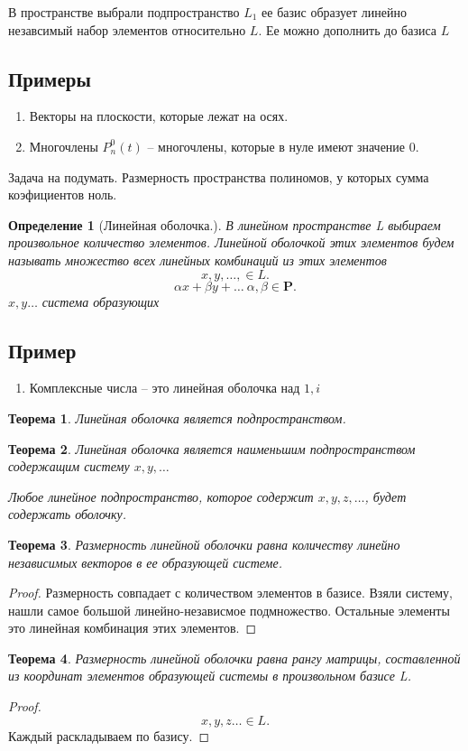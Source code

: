 \documentclass{scrartcl}
\newtheorem{theorem}{Теорема}
\newtheorem{definition}{Определение}
\begin{document}
В пространстве выбрали подпространство $L_1$ ее базис образует линейно незавсимый набор элементов относительно $L$. Ее можно дополнить до базиса $L$
\subsection{Примеры}
\begin{enumerate}
	\item Векторы на плоскости, которые лежат на осях.
	\item Многочлены $P^{0}_{n}(t)$ -- многочлены, которые в нуле имеют значение 0.
\end{enumerate}
Задача на подумать. Размерность пространства полиномов, у которых сумма коэфициентов ноль.
\begin{definition}[Линейная оболочка.]
	В линейном пространстве L выбираем произвольное количество элементов. Линейной оболочкой этих элементов будем называть множество всех линейных комбинаций из этих элементов
	\[
		x,y,\dots, \in L
		.\]
	\[
		\alpha x + \beta y + \dots ~ \alpha,\beta \in \mathbf{P}
		.\]
	$x,y \dots$ система образующих
\end{definition}
\subsection{Пример}
\begin{enumerate}
	\item Комплексные числа -- это линейная оболочка над $1,i$
\end{enumerate}
\begin{theorem}
	Линейная оболочка является подпространством.
\end{theorem}
\begin{theorem}
	Линейная оболочка является наименьшим подпространством содержащим систему $x,y,\dots$

	Любое линейное подпространство, которое содержит $x,y,z,\dots$, будет содержать оболочку.
\end{theorem}
\begin{theorem}
	Размерность линейной оболочки равна количеству линейно независимых векторов в ее образующей системе.
\end{theorem}
\begin{proof}
	Размерность совпадает с количеством элементов в базисе. Взяли систему, нашли самое большой линейно-независмое подмножество. Остальные элементы это линейная комбинация этих элементов.
\end{proof}
\begin{theorem}
	Размерность линейной оболочки равна рангу матрицы, составленной из координат элементов образующей системы в произвольном базисе L.
\end{theorem}
\begin{proof}
	\[
		x,y,z \dots \in L
		.\]
	Каждый раскладываем по базису.
\end{proof}
\end{document}
